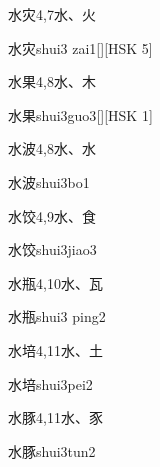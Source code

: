 \begin{entry}{水灾}{4,7}{⽔、⽕}
  \begin{phonetics}{水灾}{shui3 zai1}[][HSK 5]
  \end{phonetics}
\end{entry}

\begin{entry}{水果}{4,8}{⽔、⽊}
  \begin{phonetics}{水果}{shui3guo3}[][HSK 1]
  \end{phonetics}
\end{entry}

\begin{entry}{水波}{4,8}{⽔、⽔}
  \begin{phonetics}{水波}{shui3bo1}
  \end{phonetics}
\end{entry}

\begin{entry}{水饺}{4,9}{⽔、⾷}
  \begin{phonetics}{水饺}{shui3jiao3}
  \end{phonetics}
\end{entry}

\begin{entry}{水瓶}{4,10}{⽔、⽡}
  \begin{phonetics}{水瓶}{shui3 ping2}
  \end{phonetics}
\end{entry}

\begin{entry}{水培}{4,11}{⽔、⼟}
  \begin{phonetics}{水培}{shui3pei2}
  \end{phonetics}
\end{entry}

\begin{entry}{水豚}{4,11}{⽔、⾗}
  \begin{phonetics}{水豚}{shui3tun2}
  \end{phonetics}
\end{entry}


